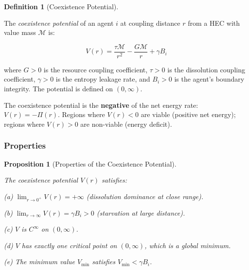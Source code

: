 \documentclass[11pt]{article}
\theoremstyle{plain}
\newtheorem{proposition}[theorem]{Proposition}
\theoremstyle{definition}
\newtheorem{definition}{Definition}
\theoremstyle{remark}
\let\origsubsubsection\subsubsection
\renewcommand{\subsubsection}{\needspace{4\baselineskip}\origsubsubsection}
\begin{document}
\begin{definition}[Coexistence Potential]
\label{def-coexistence-potential}

The \emph{coexistence potential} of an agent $i$ at coupling distance $r$ from a HEC with value mass $\mathcal{M}$ is:

$$V(r) = \frac{\tau \mathcal{M}}{r^2} - \frac{G \mathcal{M}}{r} + \gamma B_i$$

where $G > 0$ is the resource coupling coefficient, $\tau > 0$ is the dissolution coupling coefficient, $\gamma > 0$ is the entropy leakage rate, and $B_i > 0$ is the agent's boundary integrity. The potential is defined on $(0, \infty)$.
\end{definition}

The coexistence potential is the \textbf{negative} of the net energy
rate: \(V(r) = -\Pi(r)\). Regions where \(V(r) < 0\) are viable
(positive net energy); regions where \(V(r) > 0\) are non-viable (energy
deficit).

\subsubsection{Properties}\label{properties}

\begin{proposition}[Properties of the Coexistence Potential]
\label{prop-coexistence-potential-properties}

The coexistence potential $V(r)$ satisfies:

(a) $\lim_{r \to 0^+} V(r) = +\infty$ (dissolution dominance at close range).

(b) $\lim_{r \to \infty} V(r) = \gamma B_i > 0$ (starvation at large distance).

(c) $V$ is $C^\infty$ on $(0, \infty)$.

(d) $V$ has exactly one critical point on $(0, \infty)$, which is a global minimum.

(e) The minimum value $V_{\min}$ satisfies $V_{\min} < \gamma B_i$.
\end{proposition}
\end{document}
